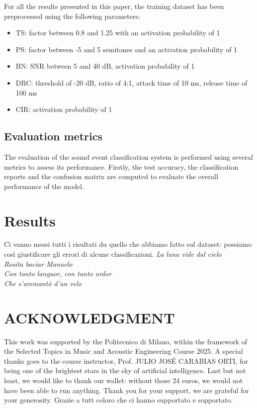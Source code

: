 \documentclass{article}
\begin{document}
\begin{sloppy}

For all the results presented in this paper, the training dataset has been preprocessed using the following parameters:
\begin{itemize}
    \item TS: factor between 0.8 and 1.25 with an activation probability of 1
    \item PS: factor between -5 and 5 semitones and an activation probability of 1
    \item BN: SNR between 5 and 40 dB, activation probability of 1
    \item DRC: threshold of -20 dB, ratio of 4:1, attack time of 10 ms, release time of 100 ms
    \item CIR: activation probability of 1
\end{itemize}


\subsection{Evaluation metrics}
\label{sec:metrics}
The evaluation of the sound event classification system is performed using several metrics to assess its performance.
Firstly, the test accuracy, the classification reports and the confusion matrix are computed to evaluate the overall performance of the model.




\section{Results}
\label{sec:results}

Ci vanno messi tutti i risultati du quello che abbiamo fatto sul dataset: possiamo così giustificare gli errori di alcune classificazioni.
\textit{La luna vide dal cielo}
\\\textit{Rosita baciar Manuelo}
\\\textit{Con tanto languor, con tanto ardor}
\\\textit{Che s'ammantò d'un velo}

\section{ACKNOWLEDGMENT}
\label{sec:ack}


This work was supported by the Politecnico di Milano,
within the framework of the Selected Topics in Music and Acoustic Engineering Course 2025.
A special thanks goes to the course instructor, Prof. JULIO JOSÉ CARABIAS ORTI, for being
one of the brightest stars in the sky of artificial intelligence.
Last but not least, we would like to thank our wallet: without those 24 euros, we would not have been able to run anything.
Thank you for your support, we are grateful for your generosity.
Grazie a tutt coloro che ci hanno supportato e sopportato.




\end{sloppy}
\end{document}
